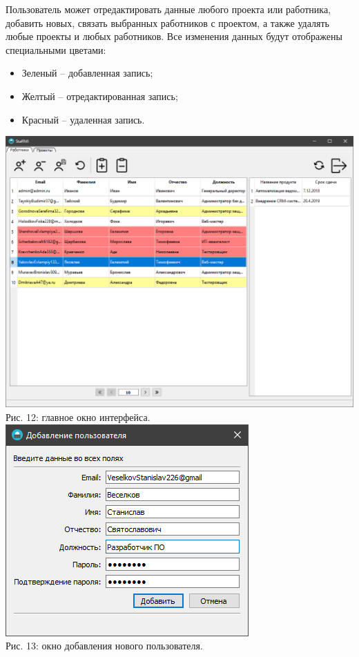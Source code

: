 \documentclass[14pt, a4paper]{extarticle}
\begin{document}
    Пользователь может отредактировать данные любого проекта или работника, добавить новых, связать выбранных работников с проектом, а также удалять любые проекты и любых работников. Все изменения данных будут отображены специальными цветами:
    \begin{itemize}
        \item Зеленый – добавленная запись;
        \item Желтый – отредактированная запись;
        \item Красный – удаленная запись.
    \end{itemize}

    \begin{center}
        \includegraphics[width=\textwidth]{img/main_window_win.png}\\
        Рис. 12: главное окно интерфейса.\\[\baselineskip]
        \includegraphics[scale=0.6]{img/add_user_window_win.png}\\
        Рис. 13: окно добавления нового пользователя.\\[\baselineskip]
    \end{center}
\end{document}
